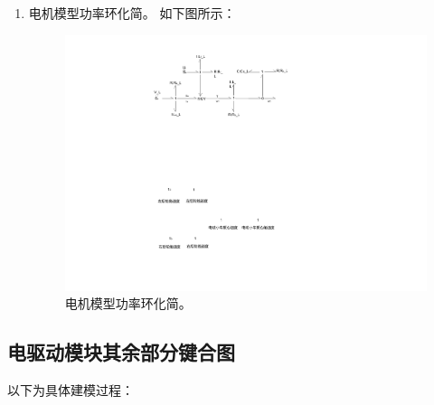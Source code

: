 \begin{enumerate}
	\item 电机模型功率环化简。
	如下图所示：
	\begin{figure}[!h]
		\centering
		\includegraphics[width=1\textwidth]{fig/4_5_bond.pdf}
		\caption{电机模型功率环化简。}\label{fig:4_5_bond}
	\end{figure}
	
\end{enumerate}

\clearpage

\subsection{电驱动模块其余部分键合图}

以下为具体建模过程：

